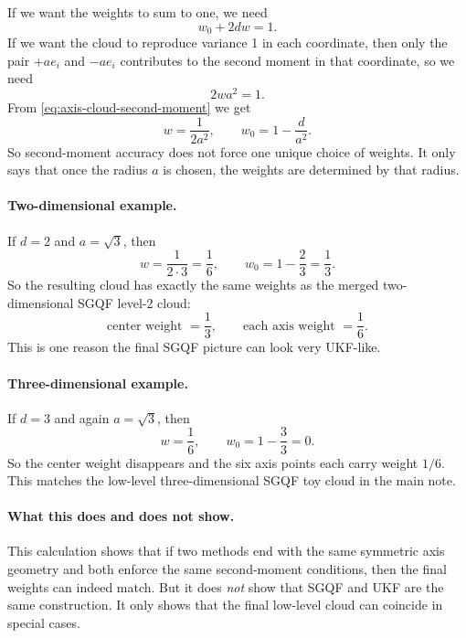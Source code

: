\documentclass[11pt]{article}
\begin{document}
If we want the weights to sum to one, we need
\begin{equation}
  w_0 + 2dw = 1.
  \label{eq:axis-cloud-total-weight}
\end{equation}
If we want the cloud to reproduce variance 1 in each coordinate, then only the
pair \(+ae_i\) and \(-ae_i\) contributes to the second moment in that coordinate,
so we need
\begin{equation}
  2wa^2 = 1.
  \label{eq:axis-cloud-second-moment}
\end{equation}
From \eqref{eq:axis-cloud-second-moment} we get
\begin{equation}
  w = \frac{1}{2a^2},
  \qquad
  w_0 = 1-\frac{d}{a^2}.
  \label{eq:axis-cloud-weights-solved}
\end{equation}
So second-moment accuracy does not force one unique choice of weights.  It only
says that once the radius \(a\) is chosen, the weights are determined by that
radius.

\paragraph{Two-dimensional example.}
If \(d=2\) and \(a=\sqrt3\), then
\begin{equation}
  w = \frac{1}{2\cdot 3}=\frac16,
  \qquad
  w_0 = 1-\frac{2}{3}=\frac13.
  \label{eq:axis-cloud-2d-weights}
\end{equation}
So the resulting cloud has exactly the same weights as the merged two-dimensional
SGQF level-2 cloud:
\begin{equation}
  \text{center weight }=\frac13,
  \qquad
  \text{each axis weight }=\frac16.
  \label{eq:axis-cloud-2d-match}
\end{equation}
This is one reason the final SGQF picture can look very UKF-like.

\paragraph{Three-dimensional example.}
If \(d=3\) and again \(a=\sqrt3\), then
\begin{equation}
  w = \frac16,
  \qquad
  w_0 = 1-\frac{3}{3}=0.
  \label{eq:axis-cloud-3d-weights}
\end{equation}
So the center weight disappears and the six axis points each carry weight
\(1/6\).  This matches the low-level three-dimensional SGQF toy cloud in the
main note.

\paragraph{What this does and does not show.}
This calculation shows that if two methods end with the same symmetric axis
geometry and both enforce the same second-moment conditions, then the final
weights can indeed match.  But it does \emph{not} show that SGQF and UKF are the
same construction.  It only shows that the final low-level cloud can coincide in
special cases.
\end{document}
